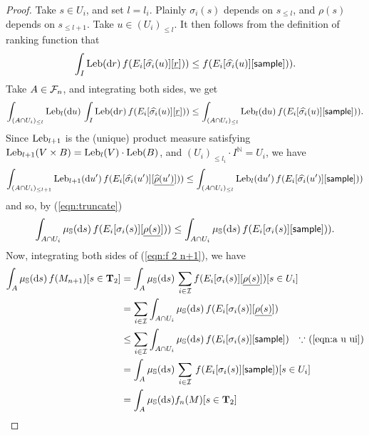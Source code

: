 \begin{proof}
Take $s \in U_i$, and set $l = l_i$.
Plainly $\sigma_i(s)$ depends on $s_{\leq l}$, and $\rho(s)$ depends on $s_{\leq l +1}$.
Take $u \in (U_i)_{\leq l}$.
It then follows from the definition of ranking function that
\[%
\int_I \Leb(\dif r) \, f(E_i[\widehat{\sigma_i}(u)][\underline{r}])) \leq f(E_i[\widehat{\sigma_i}(u)][\tsample])).
\]
Take $A \in \mathcal{F}_n$, and integrating both sides, we get
\[
\int_{(A \cap U_i)_{\leq l}} \mathrm{Leb}_l(\mathrm{d} u) \, \int_I \textrm{Leb}(\mathrm{d} r) \, f(E_i[\widehat{\sigma_i}(u)][\underline{r}])) 
\leq \int_{(A \cap U_i)_{\leq l}} \mathrm{Leb}_l(\mathrm{d} u) \, f(E_i[\widehat{\sigma_i}(u)][\mathsf{sample}])).
\]
Since $\mathrm{Leb}_{l+1}$ is the (unique) product measure satisfying $\mathrm{Leb}_{l+1}(V \times B) = \mathrm{Leb}_l(V) \cdot \mathrm{Leb}(B)$, and $(U_i)_{\leq l_i} \cdot I^{\mathbb N} = U_i$, we have
\[
\int_{(A \cap U_i)_{\leq l+1}} \mathrm{Leb}_{l+1}(\mathrm{d} u') \, f(E_i[\widehat{\sigma_i}(u')][\underline{\widehat{\rho}(u')}])) 
\leq 
\int_{(A \cap U_i)_{\leq l}} \mathrm{Leb}_l(\mathrm{d} u') \, f(E_i[\widehat{\sigma_i}(u')][\mathsf{sample}]))
\]
and so, by (\ref{eqn:truncate})
\[
\int_{A \cap U_i} \mu_{\entrosp}(\dif s) \, f(E_i[\sigma_i(s)][\underline{\rho(s)}])) \nonumber \leq 
\int_{A \cap U_i} \mu_{\entrosp}(\dif s) \, f(E_i[\sigma_i(s)][\tsample])).
\label{eqn:a u ui}
\]
Now, integrating both sides of (\ref{eqn:f 2 n+1}), we have
\begin{align*}
\int_A \mu_{{\mathbb{S}}}(\mathrm{d} s) \, f(M_{n+1})[s \in \mathbf{T}_2] 
&= 
\int_A \mu_{{\mathbb{S}}}(\mathrm{d} s) \, \sum_{i \in \mathcal{I}} f(E_i[\sigma_i(s)][\underline{\rho(s)}])[s \in U_i] \\
&= 
\sum_{i \in \mathcal{I}} \int_{A \cap U_i} \mu_{{\mathbb{S}}}(\mathrm{d} s) \, f(E_i[\sigma_i(s)][\underline{\rho(s)}])\\
&\leq 
\sum_{i \in \mathcal{I}} \int_{A \cap U_i} \mu_{{\mathbb{S}}}(\mathrm{d} s) \, f(E_i[\sigma_i(s)][\mathsf{sample}])
\quad \hbox{$\because$ (\ref{eqn:a u ui})}\\
&= 
\int_{A} \mu_{{\mathbb{S}}}(\mathrm{d} s) \, \sum_{i \in \mathcal{I}} \, f(E_i[\sigma_i(s)][\mathsf{sample}])[s \in U_i]\\
&= \int_{A} \mu_{{\mathbb{S}}}(\mathrm{d} s) f_{n}(M)[s \in \mathbf{T}_2]
\end{align*}

\end{proof}

